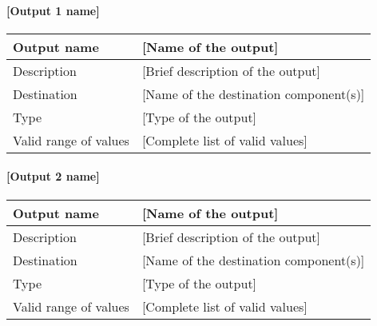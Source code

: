 \paragraph{[Output 1 name]}

\begin{longtable}{p{}p{}}
\toprule
Output name				& [Name of the output] \\
\midrule
Description				& [Brief description of the output] \\
\midrule
Destination				& [Name of the destination component(s)] \\ 
\midrule
Type						& [Type of the output] \\
\midrule
Valid range of values	& [Complete list of valid values] \\
\bottomrule
\end{longtable}


\paragraph{[Output 2 name]}

\begin{longtable}{p{}p{}}
\toprule
Output name				& [Name of the output] \\
\midrule
Description				& [Brief description of the output] \\
\midrule
Destination				& [Name of the destination component(s)] \\ 
\midrule
Type						& [Type of the output] \\
\midrule
Valid range of values	& [Complete list of valid values] \\
\bottomrule
\end{longtable}
